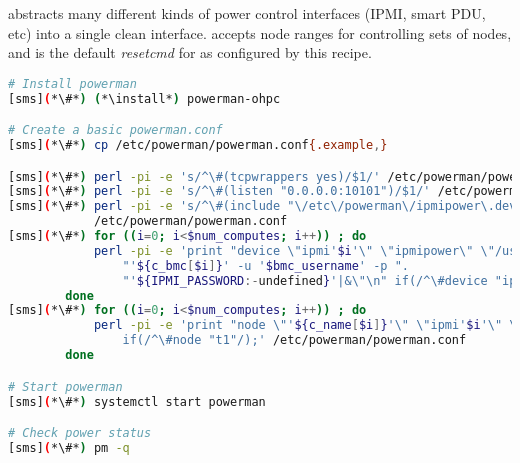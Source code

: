 \powerman{} abstracts many different kinds of power control interfaces (IPMI,
smart PDU, etc) into a single clean interface. \powerman{} accepts node ranges
for controlling sets of nodes, and is the default {\em resetcmd} for \conman{}
as configured by this recipe.

\begin{lstlisting}[language=bash,keywords={},upquote=true]
# Install powerman
[sms](*\#*) (*\install*) powerman-ohpc

# Create a basic powerman.conf
[sms](*\#*) cp /etc/powerman/powerman.conf{.example,}

[sms](*\#*) perl -pi -e 's/^\#(tcpwrappers yes)/$1/' /etc/powerman/powerman.conf
[sms](*\#*) perl -pi -e 's/^\#(listen "0.0.0.0:10101")/$1/' /etc/powerman/powerman.conf
[sms](*\#*) perl -pi -e 's/^\#(include "\/etc\/powerman\/ipmipower\.dev")/$1/' \
            /etc/powerman/powerman.conf
[sms](*\#*) for ((i=0; i<$num_computes; i++)) ; do
            perl -pi -e 'print "device \"ipmi'$i'\" \"ipmipower\" \"/usr/sbin/ipmipower -h ".
                "'${c_bmc[$i]}' -u '$bmc_username' -p ".
                "'${IPMI_PASSWORD:-undefined}'|&\"\n" if(/^\#device "ipmi1"/);' /etc/powerman/powerman.conf
        done
[sms](*\#*) for ((i=0; i<$num_computes; i++)) ; do
            perl -pi -e 'print "node \"'${c_name[$i]}'\" \"ipmi'$i'\" \"'${c_bmc[$i]}'\"\n"
                if(/^\#node "t1"/);' /etc/powerman/powerman.conf
        done

# Start powerman
[sms](*\#*) systemctl start powerman

# Check power status
[sms](*\#*) pm -q
\end{lstlisting}

